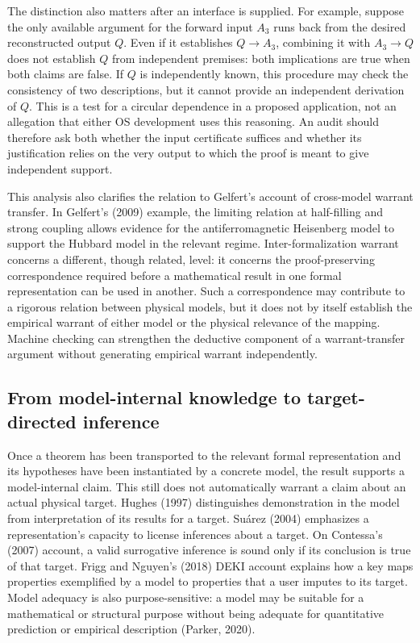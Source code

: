 \documentclass[pdflatex,sn-apa]{sn-jnl}
\begin{document}
The distinction also matters after an interface is supplied. For example, suppose the only available argument for the forward input \(A_3\) runs back from the desired reconstructed output \(Q\). Even if it establishes \(Q\to A_3\), combining it with \(A_3\to Q\) does not establish \(Q\) from independent premises: both implications are true when both claims are false. If \(Q\) is independently known, this procedure may check the consistency of two descriptions, but it cannot provide an independent derivation of \(Q\). This is a test for a circular dependence in a proposed application, not an allegation that either OS development uses this reasoning. An audit should therefore ask both whether the input certificate suffices and whether its justification relies on the very output to which the proof is meant to give independent support.

This analysis also clarifies the relation to Gelfert's account of cross-model warrant transfer. In Gelfert's (2009) example, the limiting relation at half-filling and strong coupling allows evidence for the antiferromagnetic Heisenberg model to support the Hubbard model in the relevant regime. Inter-formalization warrant concerns a different, though related, level: it concerns the proof-preserving correspondence required before a mathematical result in one formal representation can be used in another. Such a correspondence may contribute to a rigorous relation between physical models, but it does not by itself establish the empirical warrant of either model or the physical relevance of the mapping. Machine checking can strengthen the deductive component of a warrant-transfer argument without generating empirical warrant independently.

\subsection{From model-internal knowledge to target-directed inference}

Once a theorem has been transported to the relevant formal representation and its hypotheses have been instantiated by a concrete model, the result supports a model-internal claim. This still does not automatically warrant a claim about an actual physical target. Hughes (1997) distinguishes demonstration in the model from interpretation of its results for a target. Suárez (2004) emphasizes a representation's capacity to license inferences about a target. On Contessa's (2007) account, a valid surrogative inference is sound only if its conclusion is true of that target. Frigg and Nguyen's (2018) DEKI account explains how a key maps properties exemplified by a model to properties that a user imputes to its target. Model adequacy is also purpose-sensitive: a model may be suitable for a mathematical or structural purpose without being adequate for quantitative prediction or empirical description (Parker, 2020).
\end{document}
